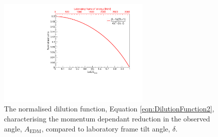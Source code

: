 \begin{figure}[t!]
\centering{}
\includegraphics[trim={0 0 0 0},clip,width=0.65\textwidth]{Images/Chapter2/AverageAEDMFunction.pdf}
\caption{The normalised dilution function, Equation \ref{eqn:DilutionFunction2}, characterising the momentum dependant reduction in the observed angle, $A_{\text{EDM}}$, compared to laboratory frame tilt angle, $\delta$.}
\label{fig:DilutionFunc}
\end{figure}
